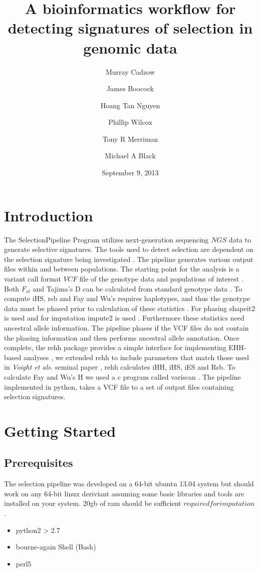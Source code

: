 \documentclass[a4paper,10pt]{article}
\title{\textbf{A bioinformatics workflow for detecting signatures of selection in genomic data}}
\date{September 9, 2013}
\author[1,2]{Murray Cadzow}
\author[1,2]{James Boocock}
\author[1,2]{Hoang Tan Nguyen}
\author[2,3]{Phillip Wilcox}
\author[1]{Tony R Merriman}
\author[1]{Michael A Black}
\affil[1]{Department of Biochemistry, University of Otago}
\affil[2]{Department of Mathematics and Statistics, University of Otago}
\affil[3]{Scion Research, Rotorua, New Zealand}
\begin{document}
\maketitle{}
\doublespacing
\tableofcontents
\section{Introduction}
The SelectionPipeline Program utilizes next-generation sequencing \(NGS\) data to generate selective signatures. The tools used to detect selection are dependent on the selection signature being investigated \citep{Sabeti:2006ha}. The pipeline generates various output files within and between populations. The starting point for the analysis is a variant call format \(VCF\) file of the genotype data and populations of interest \citep{Danecek:2011gz}. Both $F_{st}$ and Tajima's D can be calculated from standard genotype data \citep{Weir:1984vn} \citep{Tajima:1989un}. To compute iHS, rsb and Fay and Wu's requires haplotypes, and thus the genotype data must be phased prior to calculation of these statistics \citep{Voight:2006go} \citep{Gautier:2012et} \citep{fayandwush}. For phasing shapeit2 is used and for imputation impute2 is used \citep{impute22009} \citep{Delaneau:2013hi}. Furthermore these statistics need ancestral allele information. The pipeline phases if the VCF files do not contain the phasing information and then performs ancestral allele annotation. Once complete, the rehh package provides a simple interface for implementing EHH-based analyses \citep{Gautier:2012et}, we extended rehh to include parameters that match those used in \emph{Voight et als.} seminal paper \citep{Voight:2006go}, rehh calculates iHH, iHS, iES and Rsb. To calculate Fay and Wu's H we used a c program called variscan \citep{variscan2005}. The pipeline implemented in python, takes a VCF file to a set of output files containing selection signatures.
\section{Getting Started}
\subsection{Prerequisites}
The selection pipeline was developed on a 64-bit ubuntu 13.04 system but should work on any 64-bit linux deriviant assuming some basic libraries and tools are installed on your system. 20gb of ram should be sufficient \(required for imputation\).
\begin{itemize}
\item python2 > 2.7 
\item bourne-again Shell (Bash)
\item perl5
\end{itemize}
\end{document}
